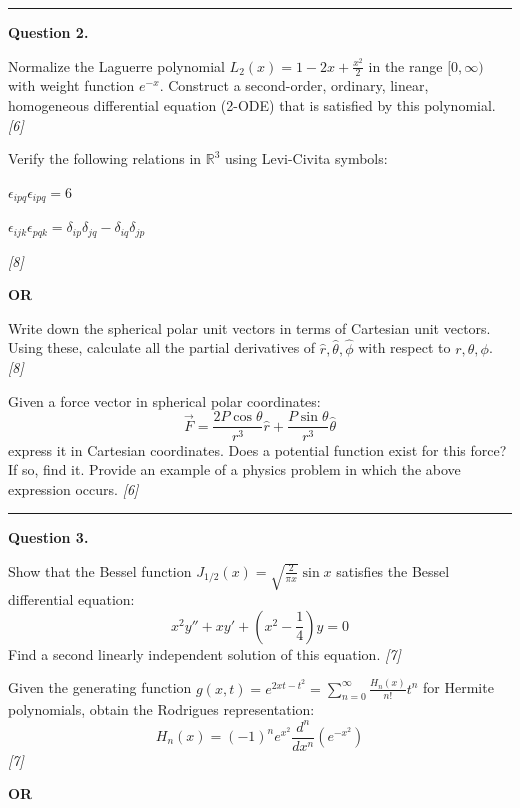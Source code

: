 \documentclass[11pt,a4paper]{article}
\newcommand{\pts}[1]{\hfill   \textit{[#1]}}
\begin{document}
\medskip\rule{\linewidth}{0.2pt}




\noindent   \textbf{Question 2.}

\begin{parts}
  \item Normalize the Laguerre polynomial $L_2(x) = 1 - 2x + \frac{x^2}{2}$ in the range $[0, \infty)$ with weight function $e^{-x}$. Construct a second-order, ordinary, linear, homogeneous differential equation (2-ODE) that is satisfied by this polynomial. \pts{6}
  \item Verify the following relations in $\mathbb{R}^3$ using Levi-Civita symbols:
    
\begin{parts}
      \item $\epsilon_{ipq} \epsilon_{ipq} = 6$
      \item $\epsilon_{ijk} \epsilon_{pqk} = \delta_{ip} \delta_{jq} - \delta_{iq} \delta_{jp}$
    \end{parts} \pts{8}
\end{parts}
\hfill   \textbf{OR}

\begin{parts}
  \item Write down the spherical polar unit vectors in terms of Cartesian unit vectors. Using these, calculate all the partial derivatives of $\hat{r}, \hat{ \theta}, \hat{\phi}$ with respect to $r,  \theta, \phi$. \pts{8}
  \item Given a force vector in spherical polar coordinates:
    \[ \vec{F} = \frac{2P \cos \theta}{r^3} \hat{r} + \frac{P \sin \theta}{r^3} \hat{ \theta} \]
    express it in Cartesian coordinates. Does a potential function exist for this force? If so, find it. Provide an example of a physics problem in which the above expression occurs. \pts{6}
\end{parts}

\medskip\rule{\linewidth}{0.2pt}




\noindent   \textbf{Question 3.}

\begin{parts}
  \item Show that the Bessel function $J_{1/2}(x) = \sqrt{\frac{2}{\pi x}} \sin x$ satisfies the Bessel differential equation:
    \[ x^2 y'' + x y' + \left( x^2 - \frac{1}{4} \right) y = 0 \]
    Find a second linearly independent solution of this equation. \pts{7}
  \item Given the generating function $g(x, t) = e^{2xt - t^2} = \sum_{n=0}^{\infty} \frac{H_n(x)}{n!} t^n$ for Hermite polynomials, obtain the Rodrigues representation:
    \[ H_n(x) = (-1)^n e^{x^2} \frac{d^n}{dx^n} \left( e^{-x^2} \right) \] \pts{7}
\end{parts}
\hfill   \textbf{OR}
\end{document}

